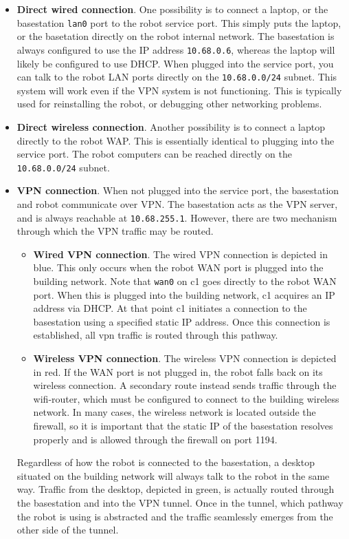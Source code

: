 \begin{itemize}
\item \textbf{Direct wired connection}.  One possibility is to connect
  a laptop, or the basestation \texttt{lan0} port to the robot service
  port.  This simply puts the laptop, or the basetation directly on
  the robot internal network.  The basestation is always configured to
  use the IP address \texttt{10.68.0.6}, whereas the laptop will
  likely be configured to use DHCP.  When plugged into the service
  port, you can talk to the robot LAN ports directly on the
  \texttt{10.68.0.0/24} subnet.  This system will work even if the VPN
  system is not functioning.  This is typically used for reinstalling
  the robot, or debugging other networking problems.
\item \textbf{Direct wireless connection}.  Another possibility is to
  connect a laptop directly to the robot WAP.  This is essentially
  identical to plugging into the service port.  The robot computers
  can be reached directly on the \texttt{10.68.0.0/24} subnet.
\item \textbf{VPN connection}.  When not plugged into the service
  port, the basestation and robot communicate over VPN.  The
  basestation acts as the VPN server, and is always reachable at
  \texttt{10.68.255.1}.  However, there are two mechanism through
  which the VPN traffic may be routed.
  \begin{itemize}
  \item \textbf{Wired VPN connection}. The wired VPN connection is
    depicted in blue.  This only occurs when the robot WAN port is
    plugged into the building network.  Note that \texttt{wan0} on c1
    goes directly to the robot WAN port.  When this is plugged into
    the building network, c1 acquires an IP address via DHCP.  At that
    point c1 initiates a connection to the basestation using a
    specified static IP address.  Once this connection is established,
    all vpn traffic is routed through this pathway.
  \item \textbf{Wireless VPN connection}.  The wireless VPN connection
    is depicted in red.  If the WAN port is not plugged in, the robot
    falls back on its wireless connection.  A secondary route instead
    sends traffic through the wifi-router, which must be configured to
    connect to the building wireless network.  In many cases, the
    wireless network is located outside the firewall, so it is
    important that the static IP of the basestation resolves properly
    and is allowed through the firewall on port 1194.
  \end{itemize}
  Regardless of how the robot is connected to the basestation, a
  desktop situated on the building network will always talk to the
  robot in the same way.  Traffic from the desktop, depicted in green,
  is actually routed through the basestation and into the VPN tunnel.
  Once in the tunnel, which pathway the robot is using is abstracted
  and the traffic seamlessly emerges from the other side of the
  tunnel.
\end{itemize}

